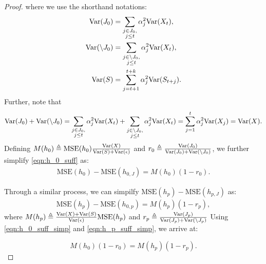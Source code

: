 \begin{proof}
where we use the shorthand notations: 
\begin{align*}
    \text{Var}(J_0) &=  \sum_{\substack{j \in J_0, \\ j \leq t}}\alpha_j^2 \text{Var}(X_{t}), \\ 
    \text{Var}(\setminus J_0) &=  \sum_{\substack{j \in \setminus J_0, \\ j \leq t}}\alpha_j^2 \text{Var}(X_{t}), \\ 
    \text{Var}(S) &= \sum_{j=t+1}^{t+k} \alpha_j^2 \text{Var}(S_{t+j}).
\end{align*}
Further, note that 
\begin{align*}
    \text{Var}(J_0)  + \text{Var}(\setminus J_0) = \sum_{\substack{j \in J_0, \\ j \leq t}}\alpha_j^2 \text{Var}(X_{t}) + \sum_{\substack{j \in \setminus J_0, \\ j \leq t}}\alpha_j^2 \text{Var}(X_{t}) = \sum_{j=1}^{t} \alpha_j^2 \text{Var}(X_j) = \text{Var}(X). 
\end{align*}
Defining $M(h_0) \triangleq \text{MSE}(h_0)  \frac{\text{Var}(X)}{\text{Var}(S) + \text{Var}(\epsilon)}$ and $r_0 \triangleq\frac{\text{Var}(J_0) }{\text{Var}(J_0) + \text{Var}(\setminus J_0)}$, we further simplify \eqref{eqn:h_0_suff} as: 
\begin{align}
    \text{MSE}(h_0) - \text{MSE}(h_{0,J}) =  M(h_0) (1 - r_0). \label{eqn:h_0_suff_simp}
\end{align}

Through a similar process, we can simpilfy $\text{MSE}(h_p) - \text{MSE}(h_{p,J})$ as: 
\begin{align}
    \text{MSE}(h_p) - \text{MSE}(h_{0,p}) =  M(h_p) (1 - r_p), \label{eqn:h_p_suff_simp}
\end{align}
where $M(h_p) \triangleq \frac{\text{Var}(X) + \text{Var}(S)}{\text{Var}(\epsilon)} \text{MSE} (h_p)$ and  $r_p \triangleq\frac{\text{Var}(J_p) }{\text{Var}(J_p) + \text{Var}(\setminus J_p)}$
Using \eqref{eqn:h_0_suff_simp} and \eqref{eqn:h_p_suff_simp}, we arrive at: 

         \begin{equation} \label{eqn:suff_M}
           M(h_0) (1-r_{0}) =  M(h_p)  (1-r_{p}).
         \end{equation}
       
    


\end{proof}
